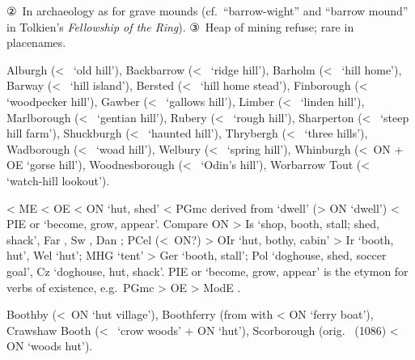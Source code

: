 \documentclass[12pt,letterpaper,oneside,article,draft]{memoir}
\begin{document}
\begin{Lemma}
\begin{Definitions}
	②~In archaeology as  for grave mounds (cf.\ “barrow-wight” and “barrow mound” in Tolkien’s \textit{Fellowship of the Ring}).
	③~Heap of mining refuse; rare in placenames.
\end{Definitions}
\begin{Examples}
	Alburgh (<~ ‘old hill’),
	Backbarrow (<~ ‘ridge hill’),
	Barholm (<~ ‘hill home’),
	Barway (<~ ‘hill island’),
	Bersted (<~ ‘hill home stead’),
	Finborough (<~ ‘woodpecker hill’),
	Gawber (<~ ‘gallows hill’),
	Limber (<~ ‘linden hill’),
	Marlborough (<~ ‘gentian hill’),
	Rubery (<~ ‘rough hill’),
	Sharperton (<~ ‘steep hill farm’),
	Shuckburgh (<~ ‘haunted hill’),
	Thrybergh (<~ ‘three hills’),
	Wadborough (<~ ‘woad hill’),
	Welbury (<~ ‘spring hill’),
	Whinburgh (<~ON  + OE  ‘gorse hill’),
	Woodnesborough (<~ ‘Odin’s hill’),
	Worbarrow Tout (<~ ‘watch-hill lookout’).
\end{Examples}
\end{Lemma}

\begin{Lemma}
\begin{Etymology}
	< ME  < OE  < ON  ‘hut, shed’
		< PGmc  derived from  ‘dwell’ (> ON  ‘dwell’)
		< PIE  or  ‘become, grow, appear’.
	Compare
	ON  > Is  ‘shop, booth, stall; shed, shack’, Far , Sw , Dan ;
	PCel  (<~ON?) > OIr  ‘hut, bothy, cabin’ > Ir  ‘booth, hut’, Wel  ‘hut’;
	MHG  ‘tent’ > Ger  ‘booth, stall’;
	Pol  ‘doghouse, shed, soccer goal’, Cz  ‘doghouse, hut, shack’.
	PIE   or  ‘become, grow, appear’ is the etymon for verbs of existence, e.g.\
		PGmc  > OE  > ModE .
\end{Etymology}
\begin{Examples}
	Boothby (<~ON  ‘hut village’),
	Boothferry (from  with  < ON  ‘ferry boat’),
	Crawshaw Booth (<~\fm{crāwe-sceaga} ‘crow woods’ + ON \fm{búð} ‘hut’),
	Scorborough (orig.\ \fm{Scogerbud} (1086) < ON \fm{skógr-búð} ‘woods hut’).
\end{Examples}
\end{Lemma}
\end{document}
